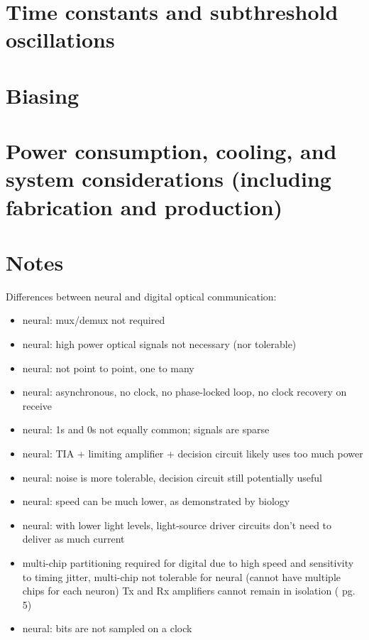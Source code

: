 \documentclass[twocolumn]{article}
\begin{document}
\section{\label{sec:time_constants}Time constants and subthreshold oscillations}

\section{\label{sec:biasing}Biasing}

\section{\label{sec:systems}Power consumption, cooling, and system considerations (including fabrication and production)}



\section{Notes}
Differences between neural and digital optical communication:
\begin{itemize}
\item neural: mux/demux not required
\item neural: high power optical signals not necessary (nor tolerable)
\item neural: not point to point, one to many
\item neural: asynchronous, no clock, no phase-locked loop, no clock recovery on receive
\item neural: 1s and 0s not equally common; signals are sparse
\item neural: TIA + limiting amplifier + decision circuit likely uses too much power
\item neural: noise is more tolerable, decision circuit still potentially useful
\item neural: speed can be much lower, as demonstrated by biology
\item neural: with lower light levels, light-source driver circuits don't need to deliver as much current
\item multi-chip partitioning required for digital due to high speed and sensitivity to timing jitter, multi-chip not tolerable for neural (cannot have multiple chips for each neuron) Tx and Rx amplifiers cannot remain in isolation (\cite{ra2012} pg. 5)
\item neural: bits are not sampled on a clock
\end{itemize}
\end{document}
